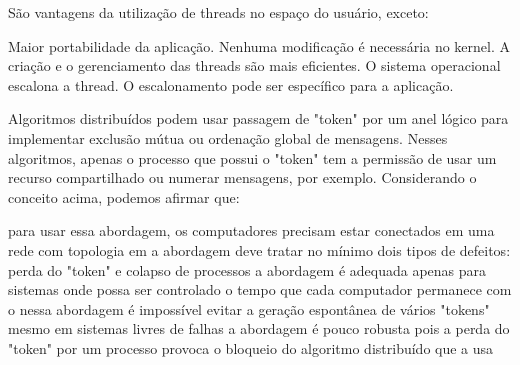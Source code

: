 \documentclass[12pt, addpoints]{exam}
\begin{document}
\begin{questions}
\question

São vantagens da utilização de threads no espaço do usuário, exceto:
\begin{choices}
\choice Maior portabilidade da aplicação.
\choice Nenhuma modificação é necessária no kernel.
\choice A criação e o gerenciamento das threads são mais eficientes.
\choice O sistema operacional escalona a thread.
\choice O escalonamento pode ser específico para a aplicação.
\end{choices}

\question

Algoritmos distribuídos podem usar passagem de "token" por um anel lógico para implementar exclusão mútua ou ordenação global de mensagens. Nesses algoritmos, apenas o processo que possui o "token" tem a permissão de usar um recurso compartilhado ou numerar mensagens, por exemplo. Considerando o conceito acima, podemos afirmar que: 
\begin{choices}
\choice para usar essa abordagem, os computadores precisam estar conectados em uma rede com topologia em 
\choice a abordagem deve tratar no mínimo dois tipos de defeitos: perda do "token" e colapso de processos 
\choice a abordagem é adequada apenas para sistemas onde possa ser controlado o tempo que cada computador permanece com o 
\choice nessa abordagem é impossível evitar a geração espontânea de vários "tokens" mesmo em sistemas livres de falhas 
\choice a abordagem é pouco robusta pois a perda do "token" por um processo provoca o bloqueio do algoritmo distribuído que a usa 
\end{choices}



    \end{questions}
    
\end{document}
